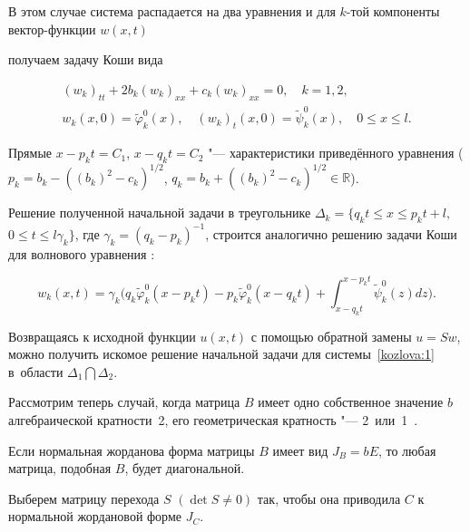 В этом случае система распадается на два уравнения и для $k$-той компоненты вектор-функции $w(x,t)$

получаем задачу Коши вида

\begin{gather*}

(w_k)_{tt}+2b_k(w_k)_{xx}+c_k(w_k)_{xx}=0,\quad k=1, 2,

\\

w_k(x,0)=\tilde{\varphi}_k^0(x),\quad (w_k)_t(x,0)=\tilde{\psi}_k^0(x),\quad 0\leq{x}\leq{l}.

\end{gather*}

Прямые $x-p_kt=C_1$, $x-q_kt=C_2$ "--- характеристики приведённого уравнения ($p_k=b_k-({(b_k)^2-c_k})^{1/2}$, $q_k=b_k+({(b_k)^2-c_k})^{1/2} \in \mathbb R$).



Решение полученной начальной задачи в треугольнике $\Delta_{k}=\{q_kt\leq{x}\leq{p_kt+l}, $ $ 0\leq{t}\leq{l\gamma_k}\}$, где $\gamma_k=(q_k-p_{k})^{-1}$, строится аналогично  решению задачи Коши для волнового уравнения \cite{kozlova:bib:Tikhonov}:

\begin{equation*}

w_k(x,t)=\gamma_k\biggl(q_k\tilde{\varphi}_k^0(x-p_kt)-p_k\tilde{\varphi}_k^0(x-q_kt)+\int\nolimits_{x-q_kt}^{x-p_kt}{\tilde{\psi}_k^0(z)dz}\biggr).

\end{equation*}





Возвращаясь к исходной функции $u(x,t)$ с помощью обратной замены $u=Sw$, можно получить искомое решение начальной задачи для системы~\eqref{kozlova:1} в~области $\Delta_{1}\bigcap\Delta_{2}$.



\smallskip



Рассмотрим теперь случай, когда матрица $B$ имеет одно собственное значение $b$ алгебраической кратности~2, его геометрическая кратность "--- 2~или~1~\cite{kozlova:bib:Gantmaher}.



Если нормальная жорданова форма матрицы $B$ имеет вид $J_B=bE$, то любая матрица, подобная $B$, будет диагональной.

Выберем матрицу перехода $S$ $(\det S\neq0)$ так, чтобы она приводила $C$ к нормальной жордановой форме $J_C$.

